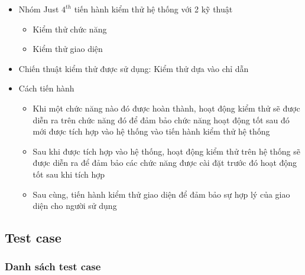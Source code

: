 \documentclass[a4paper, 12pt]{article}
\begin{document}
\begin{itemize}
	\item Nhóm Just $4^{th}$ tiến hành kiểm thử hệ thống với 2 kỹ thuật 
	\begin{itemize}
		\item Kiểm thử chức năng
		\item Kiểm thử giao diện 
	\end{itemize}

	\item Chiến thuật kiểm thử được sử dụng: Kiểm thử dựa vào chỉ dẫn
	\item Cách tiến hành
	\begin{itemize}
		\item Khi một chức năng nào đó được hoàn thành, hoạt động kiểm thử sẽ được diễn ra trên chức năng đó để đảm bảo chức năng hoạt động tốt sau đó mới được tích hợp vào hệ thống vào tiến hành kiểm thử hệ thống
		\item Sau khi được tích hợp vào hệ thống, hoạt động kiểm thử trên hệ thống sẽ được diễn ra để đảm bảo các chức năng được cài đặt trước đó hoạt động tốt sau khi tích hợp
		\item Sau cùng, tiến hành kiểm thử giao diện để đảm bảo sự hợp lý của giao diện cho người sử dụng 
	\end{itemize}
\end{itemize}

\subsection{Test case}

\subsubsection{Danh sách test case}
\end{document}

